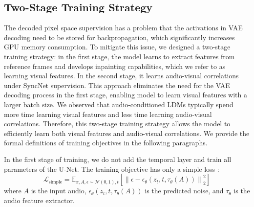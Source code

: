 \subsection{Two-Stage Training Strategy}

The decoded pixel space supervision has a problem that the activations in VAE decoding need to be stored for backpropagation, which significantly increases GPU memory consumption. To mitigate this issue, we designed a two-stage training strategy: in the first stage, the model learns to extract features from reference frames and develops inpainting capabilities, which we refer to as learning visual features. In the second stage, it learns audio-visual correlations under SyncNet supervision. This approach eliminates the need for the VAE decoding process in the first stage, enabling model to learn visual features with a larger batch size. We observed that audio-conditioned LDMs typically spend more time learning visual features and less time learning audio-visual correlations. Therefore, this two-stage training strategy allows the model to efficiently learn both visual features and audio-visual correlations. We provide the formal definitions of training objectives in the following paragraphs.

In the first stage of training, we do not add the temporal layer \cite{guo2023animatediff,blattmann2023align} and train all parameters of the U-Net. The training objective has only a simple loss \cite{ho2020denoising}:
\begin{equation}
    \mathcal{L}_{\text{simple}} = \mathbb{E}_{x, A, \epsilon \sim \mathcal{N}(0,1), t}
    \left[ \left\| \epsilon - \epsilon_\theta(z_t, t, \tau_\theta(A)) \right\|_2^2 \right]
\end{equation}
where $A$ is the input audio, $\epsilon_\theta(z_t, t, \tau_\theta(A))$ is the predicted noise, and $\tau_\theta$ is the audio feature extractor.

